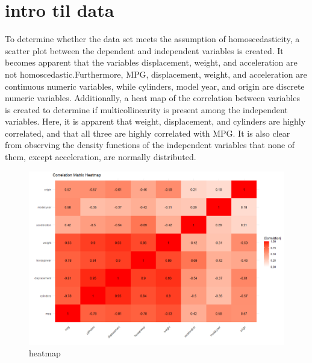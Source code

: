 


\lstset{style=mystyle}

\section{intro til data }
To determine whether the data set meets the assumption of homoscedasticity, a scatter plot between the dependent and independent variables is created. It becomes apparent that the variables displacement, weight, and acceleration are not homoscedastic.Furthermore, MPG, displacement, weight, and acceleration are continuous numeric variables, while cylinders, model year, and origin are discrete numeric variables. Additionally, a heat map of the correlation between variables is created to determine if multicollinearity is present among the independent variables. Here, it is apparent that weight, displacement, and cylinders are highly correlated, and that all three are highly correlated with MPG. It is also clear from observing the density functions of the independent variables that none of them, except acceleration, are normally distributed. 




\begin{figure}[h] 
	\centering\includegraphics[width=14cm]{p2/1.png}
	\caption{heatmap}
	\label{fig:intro1}
\end{figure}


